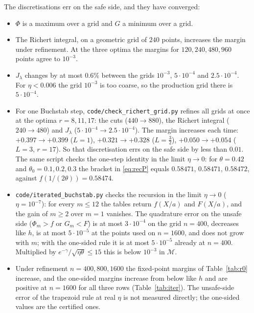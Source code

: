 \documentclass[11pt]{amsart}
\theoremstyle{remark}
\begin{document}
The discretisations err on the safe side, and they have converged:
\begin{itemize}[leftmargin=1.5em]
\item $\Phi$ is a maximum over a grid and $G$ a minimum over a grid.
\item The Richert integral, on a geometric grid of $240$ points, increases the margin under refinement. At the three optima the margins for $120,240,480,960$ points agree to $10^{-3}$.
\item $J_\lambda$ changes by at most $0.6\%$ between the grids $10^{-3}$, $5\cdot10^{-4}$ and $2.5\cdot10^{-4}$. For $\eta<0.006$ the grid $10^{-3}$ is too coarse, so the production grid there is $5\cdot10^{-4}$.
\item For one Buchstab step, \texttt{code/check\_richert\_grid.py} refines all grids at once at the optima $r=8,11,17$: the cuts ($440\to880$), the Richert integral ($240\to480$) and $J_\lambda$ ($5\cdot10^{-4}\to2.5\cdot10^{-4}$). The margin increases each time: $+0.397\to+0.399$ ($L=1$), $+0.321\to+0.328$ ($L=\frac32$), $+0.050\to+0.054$ ($L=3$, $r=17$). So that discretisation errs on the safe side by less than $0.01$. The same script checks the one-step identity in the limit $\eta\to0$: for $\theta=0.42$ and $\theta_0=0.1,0.2,0.3$ the bracket in \eqref{eq:recP} equals $0.58471$, $0.58471$, $0.58472$, against $f(1/(2\theta))=0.58474$.
\item \texttt{code/iterated\_buchstab.py} checks the recursion in the limit $\eta\to0$ ($\eta=10^{-7}$): for every $m\le12$ the tables return $f(X/a)$ and $F(X/a)$, and the gain of $m\ge2$ over $m=1$ vanishes. The quadrature error on the unsafe side ($\Phi_m>f$ or $G_m<F$) is at most $3\cdot10^{-4}$ on the grid $n=400$, decreases like $h$, is at most $5\cdot10^{-5}$ at the points used on $n=1600$, and does not grow with $m$; with the one-sided rule it is at most $5\cdot10^{-5}$ already at $n=400$. Multiplied by $e^{-\gamma}/\sqrt{\eta\theta}\le15$ this is below $10^{-3}$ in $\mathcal M$.
\item Under refinement $n=400,800,1600$ the fixed-point margins of Table~\ref{tab:r0} increase, and the one-sided margins increase from below like $h$ and are positive at $n=1600$ for all three rows (Table~\ref{tab:iter}). The unsafe-side error of the trapezoid rule at real $\eta$ is not measured directly; the one-sided values are the certified ones.
\end{itemize}
\end{document}
